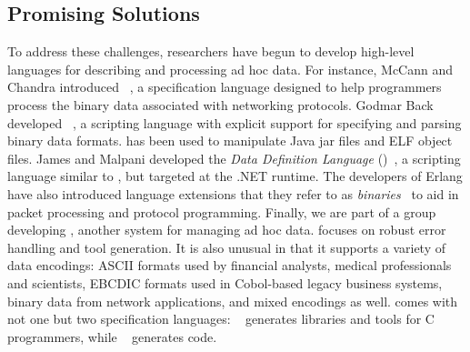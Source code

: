 \subsection{Promising Solutions}

To address these challenges, 
researchers have begun to develop high-level languages 
for describing and processing ad hoc data.  For instance,
McCann and Chandra introduced
\packettypes{}~\cite{sigcomm00}, a specification language designed to help 
programmers process the binary data associated
with networking protocols.  Godmar Back developed
\datascript{}~\cite{gpce02}, a scripting language with explicit
support for specifying and parsing binary data formats. \datascript{}
has been used to manipulate Java jar files and ELF object files.  James and Malpani developed the \textit{Data Definition Language} (\ddl{})~\cite{james+:ddl-dot-net}, a scripting language similar to \datascript{}, but targeted at the .NET runtime. The
developers of Erlang have also introduced language extensions that
they refer to as {\em binaries}~\cite{erlang-bits,gustafsson+:binaries} 
to aid in packet
processing and protocol programming.
Finally, we are part of a group developing
\pads{}, another system for managing ad hoc data.
\pads{} focuses on robust error handling and tool generation.
It is also unusual in that it supports a variety of data encodings:
ASCII formats used by financial analysts, medical professionals and scientists,
EBCDIC formats used in Cobol-based legacy business systems,
binary data from network applications, and mixed encodings as well.
\pads{} comes with not one but two specification languages: 
\padsc{}~\cite{fisher+:pads} generates
libraries and tools for C programmers, while \padsml~\cite{mandelbaum+:padsml}
generates \ocaml{} code.



